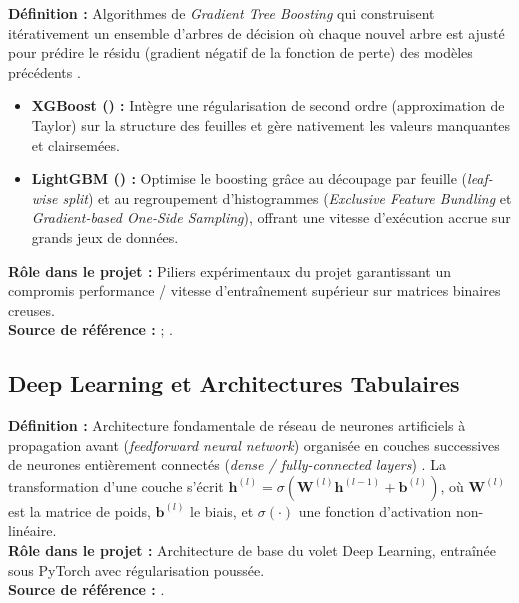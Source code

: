 \documentclass[11pt,a4paper]{article}
\begin{document}
\begin{defbox}
\textbf{Définition :} Algorithmes de \textit{Gradient Tree Boosting} qui construisent itérativement un ensemble d'arbres de décision où chaque nouvel arbre est ajusté pour prédire le résidu (gradient négatif de la fonction de perte) des modèles précédents \citep{chen2016xgboost,ke2017lightgbm}.
\begin{itemize}[leftmargin=*, label=$\bullet$]
    \item \textbf{XGBoost (\citet{chen2016xgboost}) :} Intègre une régularisation de second ordre (approximation de Taylor) sur la structure des feuilles et gère nativement les valeurs manquantes et clairsemées.
    \item \textbf{LightGBM (\citet{ke2017lightgbm}) :} Optimise le boosting grâce au découpage par feuille (\textit{leaf-wise split}) et au regroupement d'histogrammes (\textit{Exclusive Feature Bundling} et \textit{Gradient-based One-Side Sampling}), offrant une vitesse d'exécution accrue sur grands jeux de données.
\end{itemize}
\textbf{Rôle dans le projet :} Piliers expérimentaux du projet garantissant un compromis performance / vitesse d'entraînement supérieur sur matrices binaires creuses.\\
\textbf{Source de référence :} \citet{chen2016xgboost} ; \citet{ke2017lightgbm}.
\end{defbox}

\subsection{Deep Learning et Architectures Tabulaires}

\begin{defbox}
\textbf{Définition :} Architecture fondamentale de réseau de neurones artificiels à propagation avant (\textit{feedforward neural network}) organisée en couches successives de neurones entièrement connectés (\textit{dense / fully-connected layers}) \citep{goodfellow2016deep}. La transformation d'une couche s'écrit $\mathbf{h}^{(l)} = \sigma\left(\mathbf{W}^{(l)} \mathbf{h}^{(l-1)} + \mathbf{b}^{(l)}\right)$, où $\mathbf{W}^{(l)}$ est la matrice de poids, $\mathbf{b}^{(l)}$ le biais, et $\sigma(\cdot)$ une fonction d'activation non-linéaire.\\
\textbf{Rôle dans le projet :} Architecture de base du volet Deep Learning, entraînée sous PyTorch avec régularisation poussée.\\
\textbf{Source de référence :} \citet{goodfellow2016deep}.
\end{defbox}
\end{document}
